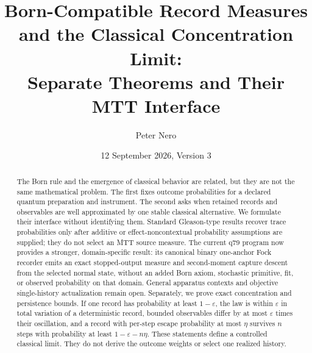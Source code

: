 \documentclass[11pt]{article}
\title{Born-Compatible Record Measures and the Classical Concentration Limit:\\
\large Separate Theorems and Their MTT Interface}
\author{Peter Nero}
\date{12 September 2026, Version 3}
\begin{document}
\maketitle

\begin{abstract}
The Born rule and the emergence of classical behavior are related, but they are
not the same mathematical problem. The first fixes outcome probabilities for a
declared quantum preparation and instrument. The second asks when retained
records and observables are well approximated by one stable classical
alternative. We formulate their interface without identifying them. Standard
Gleason-type results recover trace probabilities only after additive or
effect-noncontextual probability assumptions are supplied; they do not select
an MTT source measure. The current q79 program now provides a stronger,
domain-specific result: its canonical binary one-anchor Fock recorder emits an
exact stopped-output measure and second-moment capture descent from the selected
normal state, without an added Born axiom, stochastic primitive, fit, or
observed probability on that domain. General apparatus contexts and objective
single-history actualization remain open. Separately, we prove exact
concentration and persistence bounds. If one record has probability at least
\(1-\varepsilon\), the law is within \(\varepsilon\) in total variation of a
deterministic record, bounded observables differ by at most
\(\varepsilon\) times their oscillation, and a record with per-step escape
probability at most \(\eta\) survives \(n\) steps with probability at least
\(1-\varepsilon-n\eta\). These statements define a controlled classical limit.
They do not derive the outcome weights or select one realized history.
\end{abstract}
\end{document}
